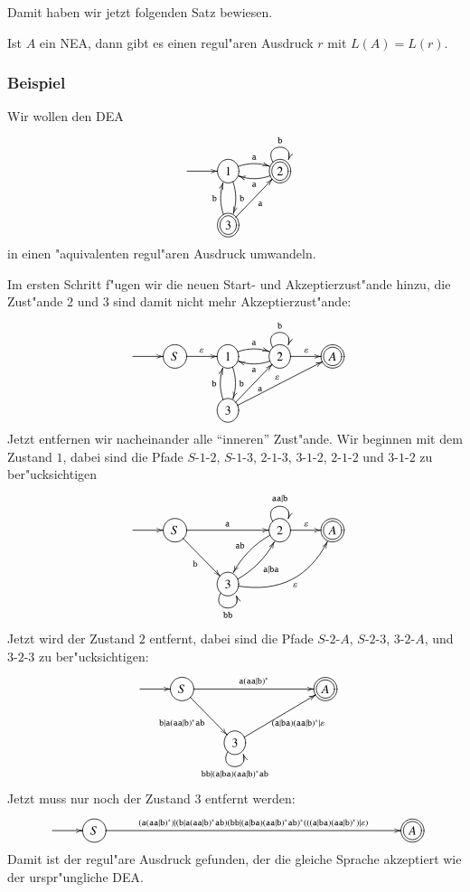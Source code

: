 Damit  haben wir jetzt folgenden Satz bewiesen.
\begin{satz}
Ist $A$ ein NEA, dann gibt es einen regul"aren Ausdruck $r$ mit
$L(A)=L(r)$.
\end{satz}

\subsubsection{Beispiel}
Wir wollen den DEA
\[
\entrymodifiers={++[o][F]}
\xymatrix{
*+\txt{}\ar[r]
	&{1}\ar@/^/[r]^{\tt a} \ar@/^/[d]^{\tt b}
		&*++[o][F=]{2} \ar@(ul,ur)^{\tt b} \ar@/^/[l]^{\tt a}
\\
*+\txt{}
	&*++[o][F=]{3} \ar[ur]_{\tt a} \ar@/^/[u]^{\tt b}
}
\]
in einen "aquivalenten regul"aren Ausdruck umwandeln.

Im ersten Schritt f"ugen wir die neuen Start- und Akzeptierzust"ande 
hinzu, die Zust"ande $2$ und $3$ sind damit nicht mehr Akzeptierzust"ande:
\[
\entrymodifiers={++[o][F]}
\xymatrix{
*+\txt{}\ar[r]
	&S\ar[r]^{\varepsilon}
		&{1}\ar@/^/[r]^{\tt a} \ar@/^/[d]^{\tt b}
			&{2} \ar@(ul,ur)^{\tt b} \ar@/^/[l]^{\tt a}\ar[r]^{\varepsilon}
				&*++[o][F=]{A}
\\
*+\txt{}
	&*+\txt{}
		&{3} \ar[ur]_{\tt a} \ar@/^/[u]^{\tt b} \ar[urr]^{\varepsilon}
}
\]
Jetzt entfernen wir nacheinander alle ``inneren'' Zust"ande. Wir beginnen mit
dem Zustand $1$, dabei sind die Pfade
$S$-$1$-$2$,
$S$-$1$-$3$,
$2$-$1$-$3$,
$3$-$1$-$2$,
$2$-$1$-$2$
und $3$-$1$-$2$
zu ber"ucksichtigen
\[
\entrymodifiers={++[o][F]}
\xymatrix{
*+\txt{}\ar[r]
	&S\ar[rr]^{\tt a} \ar[dr]_{\tt b}
		&*+\txt{}
			&{2} \ar@(ul,ur)^{\tt aa|b} \ar@/_/[dl]_{\tt ab} \ar[r]^{\varepsilon}
				&*++[o][F=]{A}
\\
*+\txt{}
	&*+\txt{}
		&{3} \ar@/_/[ur]_{\tt a|ba} \ar@/_20pt/[urr]_{\varepsilon} \ar@(dl,dr)_{\tt bb}
}
\]
Jetzt wird der Zustand $2$ entfernt, dabei sind die Pfade 
$S$-$2$-$A$,
$S$-$2$-$3$,
$3$-$2$-$A$,
und
$3$-$2$-$3$
zu ber"ucksichtigen:
\[
\entrymodifiers={++[o][F]}
\xymatrix{
*+\txt{}\ar[r]
	&S\ar[rrr]^{\tt a(aa|b)^*} \ar[dr]_{\tt b|a(aa|b)^*ab}
		&*+\txt{}
			&*+\txt{}
				&*++[o][F=]{A}
\\
*+\txt{}
	&*+\txt{}
		&{3} \ar[urr]_{{\tt (a|ba)(aa|b)^*}|\varepsilon} \ar@(dl,dr)_{{\tt bb|(a|ba)(aa|b)^*ab}}
}
\]
Jetzt muss nur noch der Zustand $3$ entfernt werden:
\[
\entrymodifiers={++[o][F]}
\xymatrix{
*+\txt{}\ar[r]
	&S\ar[rrrrrrrr]^{\tt (a(aa|b)^*)|(b|a(aa|b)^*ab)(bb|(a|ba)(aa|b)^*ab)^*(((a|ba)(aa|b)^*)|\varepsilon)}
		&*+\txt{}
			&*+\txt{}
			&*+\txt{}
			&*+\txt{}
			&*+\txt{}
			&*+\txt{}
			&*+\txt{}
				&*++[o][F=]{A}
}
\]
Damit ist der regul"are Ausdruck gefunden, der die gleiche Sprache
akzeptiert wie der urspr"ungliche DEA.


